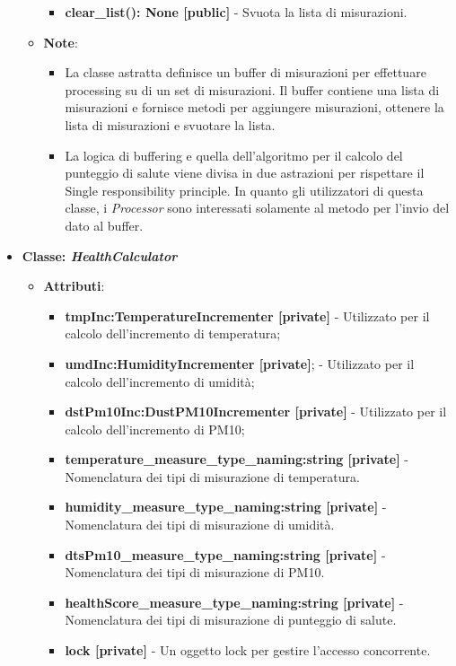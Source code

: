 \begin{itemize}
\begin{itemize}
\begin{itemize}
        \item \textbf{clear\_list(): None [public]} - Svuota la lista di misurazioni.
    \end{itemize}
    \item\textbf{Note}:
        \begin{itemize}
            \item La classe astratta definisce un buffer di misurazioni per effettuare processing su di un set di misurazioni. Il buffer contiene una lista di misurazioni e fornisce metodi per aggiungere misurazioni, ottenere la lista di misurazioni e svuotare la lista.
            \item La logica di buffering e quella dell'algoritmo per il calcolo del punteggio di salute viene divisa in due astrazioni per rispettare il Single responsibility principle. In quanto gli utilizzatori di questa classe, i \textit{Processor} sono interessati solamente al metodo per l'invio del dato al buffer.
        \end{itemize}
    \end{itemize}
    \item{\textbf{Classe: \textit{HealthCalculator}}}
    \begin{itemize}
    \item\textbf{Attributi}:
        \begin{itemize}
        \item \textbf{tmpInc:TemperatureIncrementer [private]} - Utilizzato per il calcolo dell'incremento di temperatura;
        \item \textbf{umdInc:HumidityIncrementer [private]}; - Utilizzato per il calcolo dell'incremento di umidità;
        \item \textbf{dstPm10Inc:DustPM10Incrementer [private]} - Utilizzato per il calcolo dell'incremento di PM10;
        \item \textbf{temperature\_measure\_type\_naming:string [private]} - Nomenclatura dei tipi di misurazione di temperatura.
        \item \textbf{humidity\_measure\_type\_naming:string [private]} - Nomenclatura dei tipi di misurazione di umidità.
        \item \textbf{ dtsPm10\_measure\_type\_naming:string [private]} - Nomenclatura dei tipi di misurazione di PM10.
        \item \textbf{ healthScore\_measure\_type\_naming:string [private]} - Nomenclatura dei tipi di misurazione di punteggio di salute.
        \item \textbf{lock [private]} - Un oggetto lock per gestire l'accesso concorrente.

\end{itemize}
\end{itemize}
\end{itemize}
